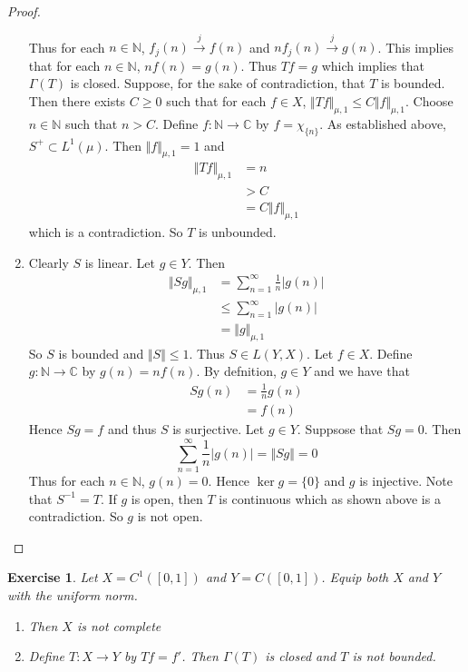 \documentclass[12pt]{amsart}
\newtheorem{ex}[thm]{Exercise}
\newcommand{\Gam}{\Gamma}
\newcommand{\C}{\mathbb{C}}
\newcommand{\N}{\mathbb{N}}
\newcommand{\conv}[1]{\xrightarrow{#1}}
\newcommand{\n}{\Vert}
\begin{document}
\begin{proof}
\begin{enumerate}
Thus for each $n \in \N$, $f_j(n) \conv{j} f(n)$ and $nf_j(n) \conv{j} g(n)$. This implies that for each $n \in \N$, $nf(n) = g(n)$. Thus $Tf = g$ which implies that $\Gam(T)$ is closed. Suppose, for the sake of contradiction, that $T$ is bounded. Then there exists $C \geq 0$ such that for each $f \in X$, $\n Tf \n_{\mu,1} \leq C \n f \n_{\mu, 1}$. Choose $n \in \N$ such that $n > C$. Define $f: \N \rightarrow \C$ by $f = \chi_{\{n\}}$. As established above, $S^+ \subset L^1(\mu)$. Then $\n f \n_{\mu,1} = 1$ and
\begin{align*}
\n Tf \n_{\mu,1}
& = n \\
&> C\\
& = C \n f \n_{\mu,1}
\end{align*}
which is a contradiction. So $T$ is unbounded.
\item Clearly $S$ is linear. Let $g \in Y$. Then \begin{align*}
\n Sg \n_{\mu,1} 
&= \sum_{n =1}^{\infty} \frac{1}{n} \vert g(n) \vert \\
& \leq  \sum_{n =1}^{\infty} \vert g(n) \vert \\
& = \n g \n_{\mu,1}
\end{align*}
So $S$ is bounded and $\n S \n \leq 1$. Thus $S \in L(Y,X)$. Let $f \in X$. Define $g: \N \rightarrow \C$ by $g(n) = nf(n)$. By defnition, $g \in Y$ and we have that
\begin{align*}
Sg(n) 
&= \frac{1}{n}g(n) \\
& = f(n)
\end{align*}
Hence $Sg =f$ and thus $S$ is surjective. Let $g \in Y$. Suppsose that $Sg = 0$. Then $$\sum_{n=1}^{\infty} \frac{1}{n}\vert g(n)\vert =\n Sg \n  = 0$$ Thus for each $n \in \N$, $g(n) = 0$. Hence $\ker g = \{0\}$ and $g$ is injective. Note that $S^{-1} = T$. If $g$ is open, then $T$ is continuous which as shown above is a contradiction. So $g$ is not open. 
\end{enumerate}
\end{proof}

\begin{ex}
Let $X = C^1([0,1])$ and $Y=C([0,1])$. Equip both $X$ and $Y$ with the uniform norm. 
\begin{enumerate}
\item Then $X$ is not complete
\item Define $T: X \rightarrow Y$ by $Tf = f'$. Then $\Gam(T)$ is closed and $T$ is not bounded. 
\end{enumerate}
\end{ex}
\end{document}
